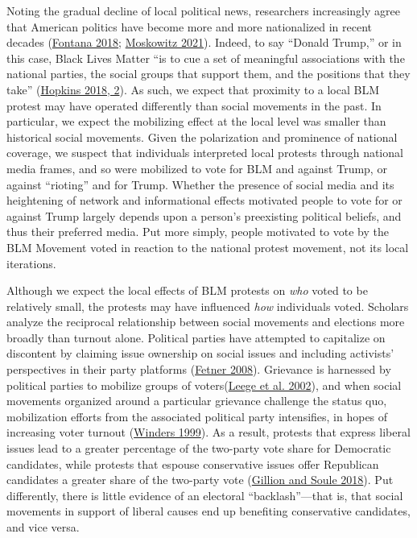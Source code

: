 \documentclass[
  12pt,
]{article}
\begin{document}
Noting the gradual decline of local political news, researchers increasingly agree that American politics have become more and more nationalized in recent decades (\protect\hyperlink{ref-Fontana2018}{Fontana 2018}; \protect\hyperlink{ref-Moskowitz2021}{Moskowitz 2021}). Indeed, to say ``Donald Trump,'' or in this case, Black Lives Matter ``is to cue a set of meaningful associations with the national parties, the social groups that support them, and the positions that they take'' (\protect\hyperlink{ref-Hopkins2018}{Hopkins 2018, 2}). As such, we expect that proximity to a local BLM protest may have operated differently than social movements in the past. In particular, we expect the mobilizing effect at the local level was smaller than historical social movements. Given the polarization and prominence of national coverage, we suspect that individuals interpreted local protests through national media frames, and so were mobilized to vote for BLM and against Trump, or against ``rioting'' and for Trump. Whether the presence of social media and its heightening of network and informational effects motivated people to vote for or against Trump largely depends upon a person's preexisting political beliefs, and thus their preferred media. Put more simply, people motivated to vote by the BLM Movement voted in reaction to the national protest movement, not its local iterations.

Although we expect the local effects of BLM protests on \emph{who} voted to be relatively small, the protests may have influenced \emph{how} individuals voted. Scholars analyze the reciprocal relationship between social movements and elections more broadly than turnout alone. Political parties have attempted to capitalize on discontent by claiming issue ownership on social issues and including activists' perspectives in their party platforms (\protect\hyperlink{ref-Fetner2008}{Fetner 2008}). Grievance is harnessed by political parties to mobilize groups of voters(\protect\hyperlink{ref-Leege2002}{Leege et al. 2002}), and when social movements organized around a particular grievance challenge the status quo, mobilization efforts from the associated political party intensifies, in hopes of increasing voter turnout (\protect\hyperlink{ref-Winders1999}{Winders 1999}). As a result, protests that express liberal issues lead to a greater percentage of the two-party vote share for Democratic candidates, while protests that espouse conservative issues offer Republican candidates a greater share of the two-party vote (\protect\hyperlink{ref-Gillion2018}{Gillion and Soule 2018}). Put differently, there is little evidence of an electoral ``backlash''---that is, that social movements in support of liberal causes end up benefiting conservative candidates, and vice versa.
\end{document}
